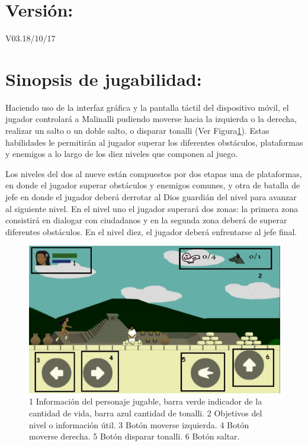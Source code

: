     	\section{Versión:} V03.18/10/17
   		\section{Sinopsis de jugabilidad:} 
Haciendo uso de la interfaz gráfica y la pantalla táctil del dispositivo móvil, el jugador controlará a Malinalli pudiendo moverse hacia la izquierda o la derecha, realizar un salto o un doble salto, o disparar tonalli (Ver Figura\ref{fig:GUI}). Estas habilidades le permitirán al jugador superar los diferentes obstáculos, plataformas y enemigos a lo largo de los diez niveles que componen al juego.
\\
\par
Los niveles del dos al nueve están compuestos por dos etapas una de plataformas, en donde el jugador superar obstáculos y enemigos comunes, y otra de batalla de jefe en donde el jugador deberá derrotar al Dios guardián del nivel para avanzar al siguiente nivel. En el nivel uno el jugador superará dos zonas: la primera zona consistirá en dialogar con ciudadanos y en la segunda zona deberá de superar diferentes obstáculos. En el nivel diez, el jugador deberá enfrentarse al jefe final.
   		
   		
 

\begin{figure}
				\centering
				\includegraphics[height=0.3 \textheight]{Imagenes/ControlCorrerDer}
				\caption{1 Información del personaje jugable, barra verde indicador de la cantidad de vida, barra azul cantidad de tonalli. 2 Objetivos del nivel o información útil. 3 Botón moverse izquierda. 4 Botón moverse derecha. 5 Botón disparar tonalli. 6 Botón saltar.}
				\label{fig:GUI}
\end{figure}

